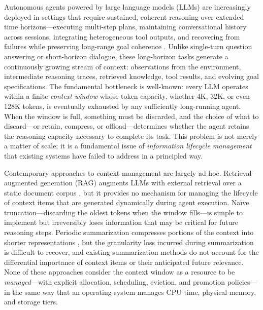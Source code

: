 \documentclass[review,12pt]{elsarticle}
\begin{document}
Autonomous agents powered by large language models (LLMs) are increasingly
deployed in settings that require sustained, coherent reasoning over extended
time horizons—executing multi-step plans, maintaining conversational history
across sessions, integrating heterogeneous tool outputs, and recovering from
failures while preserving long-range goal coherence
\citep{wang2023survey,xi2023rise,autogpt2023}.  Unlike single-turn question
answering or short-horizon dialogue, these long-horizon tasks generate a
continuously growing stream of context: observations from the environment,
intermediate reasoning traces, retrieved knowledge, tool results, and evolving
goal specifications.  The fundamental bottleneck is well-known: every LLM
operates within a finite \emph{context window} whose token capacity, whether
4K, 32K, or even 128K tokens, is eventually exhausted by any sufficiently
long-running agent.  When the window is full, something must be discarded,
and the choice of what to discard—or retain, compress, or offload—determines
whether the agent retains the reasoning capacity necessary to complete its task.
This problem is not merely a matter of scale; it is a fundamental issue of
\emph{information lifecycle management} that existing systems have failed to
address in a principled way.

Contemporary approaches to context management are largely ad hoc.
Retrieval-augmented generation (RAG) augments LLMs with external retrieval
over a static document corpus \citep{lewis2020rag}, but it provides no
mechanism for managing the lifecycle of context items that are generated
dynamically during agent execution.  Na\"{i}ve truncation—discarding the oldest
tokens when the window fills—is simple to implement but irreversibly loses
information that may be critical for future reasoning steps.  Periodic
summarization compresses portions of the context into shorter representations
\citep{chevalier2023autocompressors}, but the granularity loss incurred during
summarization is difficult to recover, and existing summarization methods do
not account for the differential importance of context items or their
anticipated future relevance.  None of these approaches consider the context
window as a resource to be \emph{managed}—with explicit allocation, scheduling,
eviction, and promotion policies—in the same way that an operating system
manages CPU time, physical memory, and storage tiers.
\end{document}
